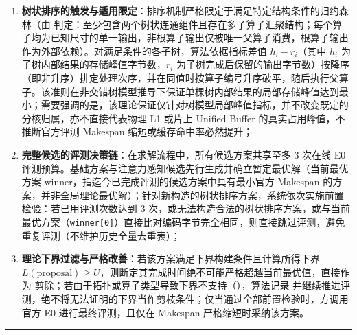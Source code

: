 \documentclass[anonymous,withtoc]{gmcm2026}
\providecommand{\tightlist}{\setlength{\itemsep}{0pt}\setlength{\parskip}{0pt}}
\begin{document}
\begin{enumerate}
\def\labelenumi{\arabic{enumi}.}
\tightlist
\item
  \textbf{树状排序的触发与适用限定}：排序机制严格限定于满足特定结构条件的归约森林（由 \texttt{} 判定：至少包含两个树状连通组件且存在多子算子汇聚结构；每个算子均为已知尺寸的单一输出，非根算子输出仅被唯一父算子消费，根算子输出作为外部依赖）。对满足条件的各子树，算法依据指标差值 \(h_i - r_i\)（其中 \(h_i\) 为子树内部结果的存储峰值字节数，\(r_i\) 为子树完成后保留的输出字节数）按降序（即非升序）排定处理次序，并在同值时按算子编号升序破平，随后执行父算子。该准则在非交错树模型推导下保证单棵树内部结果的局部存储峰值达到最小；需要强调的是，该理论保证仅针对树模型局部峰值指标，并不改变既定的分核归属，亦不直接代表物理 L1 或片上 Unified Buffer 的真实占用峰值，不推断官方评测 Makespan 缩短或缓存命中率必然提升；
\item
  \textbf{完整候选的评测决策链}：在求解流程中，所有候选方案共享至多 3 次在线 E0 评测预算。基础方案与注意力感知候选先行生成并确立暂定最优解（当前最优方案 \(\mathrm{winner}\)，指迄今已完成评测的候选方案中具有最小官方 Makespan 的方案，并非全局理论最优解）；针对新构造的树状排序方案，系统依次实施前置检验：若已用评测次数达到 3 次，或无法构造合法的树状排序方案，或与当前最优方案（\texttt{winner{[}0{]}}）直接比对编码字节完全相同，则直接跳过评测，避免重复评测（不维护历史全量去重表）；
\item
  \textbf{理论下界过滤与严格改善}：若该方案满足下界构建条件且计算所得下界 \(L(\text{proposal}) \ge U\)，则断定其完成时间绝不可能严格超越当前最优值，直接作为 \texttt{} 剪除；若由于拓扑或算子类型导致下界不支持（\texttt{}），算法记录 \texttt{} 并继续推进评测，绝不将无法证明的下界当作剪枝条件；仅当通过全部前置检验时，方调用官方 E0 进行最终评测，且仅在 Makespan 严格缩短时采纳该方案。
\end{enumerate}

\FloatBarrier
\par{}\begingroup\normalsize
\captionsetup{type=algorithm,position=top,justification=raggedright,singlelinecheck=false,labelfont=bf}
\label{alg:p3-forest-solve}
\nopagebreak\hrule\nopagebreak
\end{document}
